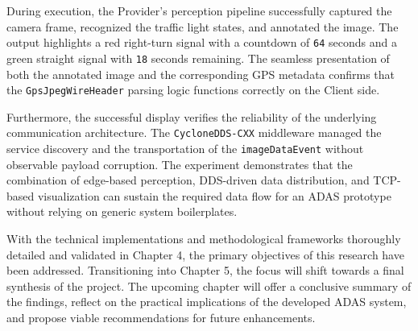 During execution, the Provider's perception pipeline successfully captured the camera frame, recognized the traffic light states, and annotated the image. The output highlights a red right-turn signal with a countdown of \texttt{64} seconds and a green straight signal with \texttt{18} seconds remaining. The seamless presentation of both the annotated image and the corresponding GPS metadata confirms that the \texttt{GpsJpegWireHeader} parsing logic functions correctly on the Client side. 

Furthermore, the successful display verifies the reliability of the underlying communication architecture. The \texttt{CycloneDDS-CXX} middleware managed the service discovery and the transportation of the \texttt{imageDataEvent} without observable payload corruption. The experiment demonstrates that the combination of edge-based perception, DDS-driven data distribution, and TCP-based visualization can sustain the required data flow for an ADAS prototype without relying on generic system boilerplates.

With the technical implementations and methodological frameworks thoroughly detailed and validated in Chapter 4, the primary objectives of this research have been addressed. Transitioning into Chapter 5, the focus will shift towards a final synthesis of the project. The upcoming chapter will offer a conclusive summary of the findings, reflect on the practical implications of the developed ADAS system, and propose viable recommendations for future enhancements.